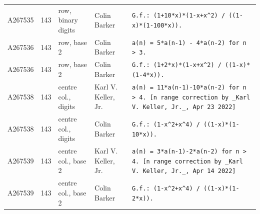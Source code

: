\documentclass[11pt]{article}
\theoremstyle{definition}
\theoremstyle{remark}
\begin{document}
{\begin{longtable}{p{1.3cm}p{0.7cm}p{2.4cm}p{2.3cm}p{7.3cm}}
A267535 & 143 & row, binary digits & Colin Barker & \texttt{G.f.: \allowbreak{}(1+\allowbreak{}10*\allowbreak{}x)\allowbreak{}*\allowbreak{}(1-\allowbreak{}x+\allowbreak{}x\^{}2)\allowbreak{} \allowbreak{}/\allowbreak{} \allowbreak{}((1-\allowbreak{}x)\allowbreak{}*\allowbreak{}(1-\allowbreak{}100*\allowbreak{}x)\allowbreak{})\allowbreak{}.} \\
A267536 & 143 & row, base 2 & Colin Barker & \texttt{a(n)\allowbreak{} \allowbreak{}=\allowbreak{} \allowbreak{}5*\allowbreak{}a(n-\allowbreak{}1)\allowbreak{} \allowbreak{}-\allowbreak{} \allowbreak{}4*\allowbreak{}a(n-\allowbreak{}2)\allowbreak{} \allowbreak{}for \allowbreak{}n \allowbreak{}> \allowbreak{}3.} \\
A267536 & 143 & row, base 2 & Colin Barker & \texttt{G.f.: \allowbreak{}(1+\allowbreak{}2*\allowbreak{}x)\allowbreak{}*\allowbreak{}(1-\allowbreak{}x+\allowbreak{}x\^{}2)\allowbreak{} \allowbreak{}/\allowbreak{} \allowbreak{}((1-\allowbreak{}x)\allowbreak{}*\allowbreak{}(1-\allowbreak{}4*\allowbreak{}x)\allowbreak{})\allowbreak{}.} \\
A267538 & 143 & centre col., digits & Karl V. Keller, Jr. & \texttt{a(n)\allowbreak{} \allowbreak{}=\allowbreak{} \allowbreak{}11*\allowbreak{}a(n-\allowbreak{}1)\allowbreak{}-\allowbreak{}10*\allowbreak{}a(n-\allowbreak{}2)\allowbreak{} \allowbreak{}for \allowbreak{}n \allowbreak{}> \allowbreak{}4. \allowbreak{}[n \allowbreak{}range \allowbreak{}correction \allowbreak{}by \allowbreak{}\_Karl \allowbreak{}V. \allowbreak{}Keller,\allowbreak{} \allowbreak{}Jr.\_,\allowbreak{} \allowbreak{}Apr \allowbreak{}23 \allowbreak{}2022]} \\
A267538 & 143 & centre col., digits & Colin Barker & \texttt{G.f.: \allowbreak{}(1-\allowbreak{}x\^{}2+\allowbreak{}x\^{}4)\allowbreak{} \allowbreak{}/\allowbreak{} \allowbreak{}((1-\allowbreak{}x)\allowbreak{}*\allowbreak{}(1-\allowbreak{}10*\allowbreak{}x)\allowbreak{})\allowbreak{}.} \\
A267539 & 143 & centre col., base 2 & Karl V. Keller, Jr. & \texttt{a(n)\allowbreak{} \allowbreak{}=\allowbreak{} \allowbreak{}3*\allowbreak{}a(n-\allowbreak{}1)\allowbreak{}-\allowbreak{}2*\allowbreak{}a(n-\allowbreak{}2)\allowbreak{} \allowbreak{}for \allowbreak{}n \allowbreak{}> \allowbreak{}4. \allowbreak{}[n \allowbreak{}range \allowbreak{}correction \allowbreak{}by \allowbreak{}\_Karl \allowbreak{}V. \allowbreak{}Keller,\allowbreak{} \allowbreak{}Jr.\_,\allowbreak{} \allowbreak{}Apr \allowbreak{}14 \allowbreak{}2022]} \\
A267539 & 143 & centre col., base 2 & Colin Barker & \texttt{G.f.: \allowbreak{}(1-\allowbreak{}x\^{}2+\allowbreak{}x\^{}4)\allowbreak{} \allowbreak{}/\allowbreak{} \allowbreak{}((1-\allowbreak{}x)\allowbreak{}*\allowbreak{}(1-\allowbreak{}2*\allowbreak{}x)\allowbreak{})\allowbreak{}.} \\

\end{longtable}}
\end{document}
